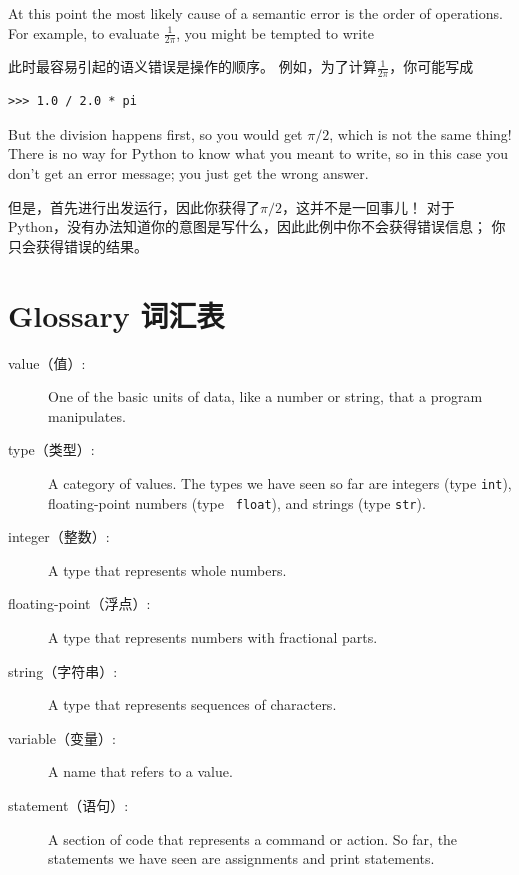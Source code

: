 \documentclass[10pt]{book}
\begin{document}
\begin{CJK}{UTF8}{gbsn}
At this point the most likely cause of a semantic error is
the order of operations.  For example, to evaluate
 $\frac{1}{2 \pi}$,
you might be tempted to write

此时最容易引起的语义错误是操作的顺序。
例如，为了计算$\frac{1}{2 \pi}$，你可能写成

\begin{verbatim}
>>> 1.0 / 2.0 * pi
\end{verbatim}
%
But the division happens first, so you would get $\pi / 2$, which
is not the same thing!  There is no way for Python
to know what you meant to write, so in this case you don't
get an error message; you just get the wrong answer.

但是，首先进行出发运行，因此你获得了$\pi / 2$，这并不是一回事儿！
对于Python，没有办法知道你的意图是写什么，因此此例中你不会获得错误信息；
你只会获得错误的结果。

\section{Glossary 词汇表}

\begin{description}

\item[value（值）:]  One of the basic units of data, like a number or string, 
that a program manipulates.

\item[type（类型）:] A category of values.  The types we have seen so far
are integers (type {\tt int}), floating-point numbers (type {\tt
float}), and strings (type {\tt str}).

\item[integer（整数）:] A type that represents whole numbers.

\item[floating-point（浮点）:] A type that represents numbers with fractional
parts.

\item[string（字符串）:] A type that represents sequences of characters.

\item[variable（变量）:]  A name that refers to a value.

\item[statement（语句）:]  A section of code that represents a command or action.  So
far, the statements we have seen are assignments and print statements.


\end{description}
\end{CJK}
\end{document}

